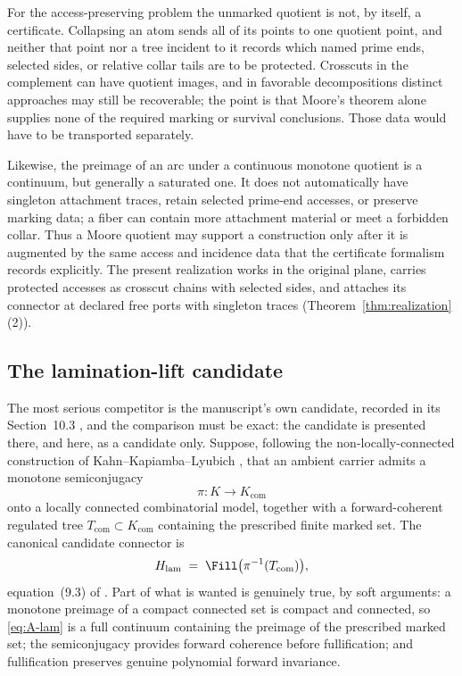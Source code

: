 For the access-preserving problem the unmarked quotient is not, by itself,
a certificate.  Collapsing an atom sends all of its points to one quotient
point, and neither that point nor a tree incident to it records which named
prime ends, selected sides, or relative collar tails are to be protected.
Crosscuts in the complement can have quotient images, and in favorable
decompositions distinct approaches may still be recoverable; the point is
that Moore's theorem alone supplies none of the required marking or
survival conclusions.  Those data would have to be transported separately.

Likewise, the preimage of an arc under a continuous monotone quotient is
a continuum, but generally a saturated one.  It does not automatically
have singleton attachment traces, retain selected prime-end accesses, or
preserve marking data; a fiber can contain more attachment material or
meet a forbidden collar.  Thus a Moore quotient may support a construction only
after it is augmented by the same access and incidence data that the
certificate formalism records explicitly.  The present realization works
in the original plane, carries protected accesses as crosscut chains with
selected sides, and attaches its connector at declared free ports with
singleton traces (Theorem~\ref{thm:realization}(2)).

\subsection{The lamination-lift candidate}
\label{subsec:A-comp-lamination}

The most serious competitor is the manuscript's own candidate, recorded
in its Section~10.3 \cite{MWman}, and the comparison must be exact:
the candidate is presented there, and here, as a candidate only.
Suppose, following the non-locally-connected construction of
Kahn--Kapiamba--Lyubich \cite{KKL26}, that an ambient carrier admits a
monotone semiconjugacy
\[
\pi\colon K\longrightarrow K_{\mathrm{com}}
\]
onto a locally connected combinatorial model, together with a
forward-coherent regulated tree $T_{\mathrm{com}}\subset K_{\mathrm{com}}$
containing the prescribed finite marked set.  The canonical candidate connector is
\begin{equation}\label{eq:A-lam}
H_{\mathrm{lam}}\;=\;\Fill\bigl(\pi^{-1}(T_{\mathrm{com}})\bigr),
\end{equation}
equation~(9.3) of \cite{MWman}.  Part of what is wanted is genuinely
true, by soft arguments: a monotone preimage of a compact connected set
is compact and connected, so \eqref{eq:A-lam} is a full continuum
containing the preimage of the prescribed marked set; the semiconjugacy provides forward
coherence before fullification; and fullification preserves genuine
polynomial forward invariance.

